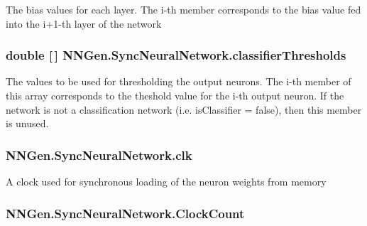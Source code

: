The bias values for each layer. The i-\/th member corresponds to the bias value fed into the i+1-\/th layer of the network 

\hypertarget{class_n_n_gen_1_1_sync_neural_network_ad044d0ce18e20de41ea9c30ad30b96b1}{}
\subsubsection[{classifier\+Thresholds}]{\setlength{\rightskip}{0pt plus 5cm}double \mbox{[}$\,$\mbox{]} N\+N\+Gen.\+Sync\+Neural\+Network.\+classifier\+Thresholds\hspace{0.3cm}{\ttfamily [get]}}\label{class_n_n_gen_1_1_sync_neural_network_ad044d0ce18e20de41ea9c30ad30b96b1}


The values to be used for thresholding the output neurons. The i-\/th member of this array corresponds to the theshold value for the i-\/th output neuron. If the network is not a classification network (i.\+e. is\+Classifier = false), then this member is unused. 

\hypertarget{class_n_n_gen_1_1_sync_neural_network_ab3381bb9b85c8a08ff4f31a123c9c246}{}
\subsubsection[{clk}]{ N\+N\+Gen.\+Sync\+Neural\+Network.\+clk\hspace{0.3cm}{\ttfamily [get]}}\label{class_n_n_gen_1_1_sync_neural_network_ab3381bb9b85c8a08ff4f31a123c9c246}


A clock used for synchronous loading of the neuron weights from memory 

\hypertarget{class_n_n_gen_1_1_sync_neural_network_a6671f2beb14d4e2f2cec90c79046f656}{}
\subsubsection[{Clock\+Count}]{ N\+N\+Gen.\+Sync\+Neural\+Network.\+Clock\+Count\hspace{0.3cm}{\ttfamily [get]}}\label{class_n_n_gen_1_1_sync_neural_network_a6671f2beb14d4e2f2cec90c79046f656}


